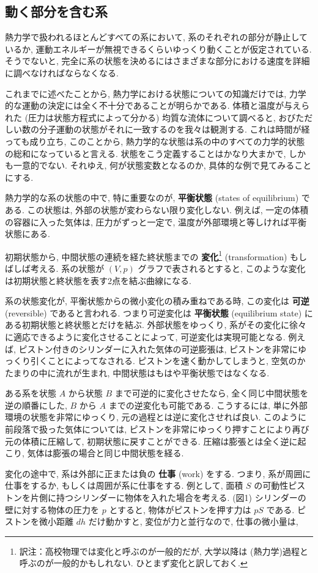 \subsection*{動く部分を含む系}
熱力学で扱われるほとんどすべての系において, 系のそれぞれの部分が静止しているか, 運動エネルギーが無視できるくらいゆっくり動くことが仮定されている. そうでないと, 完全に系の状態を決めるにはさまざまな部分における速度を詳細に調べなければならなくなる. \par
これまでに述べたことから, 熱力学における状態についての知識だけでは, 力学的な運動の決定には全く不十分であることが明らかである. 体積と温度が与えられた (圧力は状態方程式によって分かる) 均質な流体について調べると, おびただしい数の分子運動の状態がそれに一致するのを我々は観測する. これは時間が経っても成り立ち, このことから, 熱力学的な状態は系の中のすべての力学的状態の総和になっていると言える. 状態をこう定義することはかなり大まかで, しかも一意的でない. それゆえ, 何が状態変数となるのか, 具体的な例で見てみることにする. \par
熱力学的な系の状態の中で, 特に重要なのが, \textbf{平衡状態} (states of equilibrium) である. この状態は, 外部の状態が変わらない限り変化しない. 例えば, 一定の体積の容器に入った気体は, 圧力がずっと一定で, 温度が外部環境と等しければ平衡状態にある. \par
初期状態から, 中間状態の連続を経た終状態までの \textbf{変化}\footnote{訳注：高校物理では変化と呼ぶのが一般的だが, 大学以降は (熱力学)過程と呼ぶのが一般的かもしれない. ひとまず変化と訳しておく.} (transformation) もしばしば考える. 系の状態が $(V,p)$ グラフで表されるとすると, このような変化は初期状態と終状態を表す2点を結ぶ曲線になる.\par
系の状態変化が, 平衡状態からの微小変化の積み重ねである時, この変化は \textbf{可逆} (reversible) であると言われる. つまり可逆変化は \textbf{平衡状態} (equilibrium state) にある初期状態と終状態とだけを結ぶ. 外部状態をゆっくり, 系がその変化に徐々に適応できるように変化させることによって, 可逆変化は実現可能となる. 例えば, ピストン付きのシリンダーに入れた気体の可逆膨張は, ピストンを非常にゆっくり引くことによってなされる. ピストンを速く動かしてしまうと, 空気のかたまりの中に流れが生まれ, 中間状態はもはや平衡状態ではなくなる.\par
ある系を状態 $A$ から状態 $B$ まで可逆的に変化させたなら, 全く同じ中間状態を逆の順番にした, $B$ から $A$ までの逆変化も可能である. こうするには, 単に外部環境の状態を非常にゆっくり, 元の過程とは逆に変化させれば良い. このように前段落で扱った気体については, ピストンを非常にゆっくり押すことにより再び元の体積に圧縮して, 初期状態に戻すことができる. 圧縮は膨張とは全く逆に起こり, 気体は膨張の場合と同じ中間状態を経る. \par
変化の途中で, 系は外部に正または負の \textbf{仕事} (work) をする. つまり, 系が周囲に仕事をするか, もしくは周囲が系に仕事をする. 例として, 面積 $S$ の可動性ピストンを片側に持つシリンダーに物体を入れた場合を考える. (図1) シリンダーの壁に対する物体の圧力を $p$ とすると, 物体がピストンを押す力は $pS$ である. ピストンを微小距離 $dh$ だけ動かすと, 変位が力と並行なので, 仕事の微小量は, 

